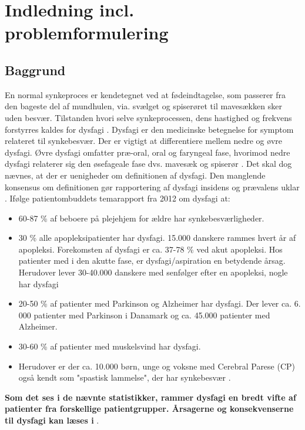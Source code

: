 \chapter{Indledning incl. problemformulering}

\section{Baggrund}
En normal synkeproces er kendetegnet ved at fødeindtagelse, som passerer fra den bageste del af mundhulen, via. svælget og spiserøret til mavesækken sker uden besvær. Tilstanden hvori selve synkeprocessen, dens hastighed og frekvens forstyrres kaldes for dysfagi \cite{Sundhedsstyrelsen2015NationalDysfagi}. Dysfagi er den medicinske betegnelse for symptom relateret til synkebesvær. Der er vigtigt at differentiere mellem nedre og øvre dysfagi. Øvre dysfagi omfatter præ-oral, oral og faryngeal fase, hvorimod nedre dysfagi relaterer sig den øsefageale fase dvs. mavesæk og spiserør \cite{KjaersgaardPh.d.studerendeDYSFAGIKonsekvenser}. Det skal dog nævnes, at der er uenigheder om definitionen af dysfagi. Den manglende konsensus om definitionen gør rapportering af dysfagi insidens og prævalens uklar \cite{KjaersgaardPh.d.studerendeDYSFAGIKonsekvenser}. Ifølge patientombuddets temarapport fra 2012 om dysfagi at:

\begin{itemize}
\item 60-87 \% af beboere på plejehjem for ældre har synkebesværligheder.
\item 30 \% alle apopleksipatienter har dysfagi. 15.000 danskere rammes hvert år af apopleksi. Forekomsten af dysfagi er ca. 37-78 \% ved akut apopleksi. Hos patienter med i den akutte fase, er dysfagi/aspiration en betydende årsag. Herudover lever 30-40.000 danskere med senfølger efter en apopleksi, nogle har dysfagi
\item 20-50 \% af patienter med Parkinson og Alzheimer har dysfagi. Der lever ca. 6. 000 patienter med Parkinson i Danamark og ca. 45.000 patienter med Alzheimer.  
\item 30-60 \% af patienter med muskelsvind har dysfagi.
\item Herudover er der ca. 10.000 børn, unge og voksne med Cerebral Parese (CP) også kendt som "spastisk lammelse", der har synkebesvær \cite{Bommersholdt2012TemarapportDysfagi}. 
\end{itemize}

\textbf{Som det ses i de nævnte statistikker, rammer dysfagi en bredt vifte af patienter fra forskellige patientgrupper. Årsagerne og konsekvenserne til dysfagi kan læses i} . 

